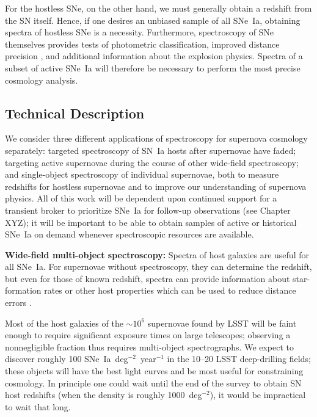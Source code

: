 For the hostless SNe, on the other
hand, we must generally obtain a redshift from the SN itself.  Hence, if one
desires an unbiased sample of all SNe~Ia, obtaining spectra of
hostless SNe is a necessity.  Furthermore, spectroscopy of SNe themselves provides tests of
photometric classification, improved distance precision
\citep{Bailey09, Blondin11, Foley11:vel}, and additional information
about the explosion physics.  Spectra of a subset of active SNe~Ia will therefore be necessary to
perform the most precise cosmology analysis.

\subsection{Technical Description}

We consider three different applications of spectroscopy for supernova cosmology separately: targeted spectroscopy of SN~Ia hosts after supernovae have faded; targeting active supernovae during the course of other wide-field spectroscopy; and single-object spectroscopy of individual supernovae, both to measure redshifts for hostless supernovae and to improve our understanding of supernova physics.  All of this work will be dependent upon continued support for a transient broker to prioritize SNe~Ia for follow-up observations (see Chapter XYZ);  it will be important to be able to obtain samples of active or historical SNe~Ia on demand whenever spectroscopic resources are available.   

{\bf Wide-field multi-object spectroscopy:}  Spectra of host galaxies are useful for all SNe~Ia.  For supernovae without spectroscopy, they can determine the redshift, but even for those of known redshift, spectra
can provide information about star-formation rates or other host properties which can
be used to reduce distance errors \citep[e.g.,][]{Pan14}.  

Most of the host galaxies of the $\sim 10^{6}$ supernovae found by LSST will be faint enough to
require significant exposure times on large telescopes; observing a nonnegligible fraction thus requires multi-object spectrographs.      
We expect to discover roughly 100 SNe~Ia~deg$^{-2}$~year$^{-1}$ in the 10--20 LSST
deep-drilling fields; these objects will have the best light curves and be most useful for constraining cosmology.  In principle one could wait until the end of the survey to obtain SN host redshifts (when the density is roughly
1000~deg$^{-2}$), it would be impractical to wait that long.  

